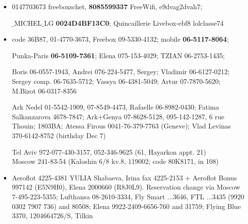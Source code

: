 \documentclass[12pt]{article}
\begin{document}
\begin{itemize}
\item  0147703673 freeboxschet,
{\bf 8085599337} FreeWifi,  e9dvag2dvah7; 

$\_$MICHEL$\_$LG {\bf 0024D4BF13C0}; Quincaillerie Livebox-ebf8 
lolclasse74

  

 



\item

code 36B87, 
 01-4770-3673,  Freebox
09-5330-4132; mobile {\bf 
06-5117-8064};

Punka-Paris {\bf 06-5109-7361}; Elena 
075-153-4029; 
TZIAN 
06-2753-1435; 

Boris 06-0557-1943, Andrei 076-224-5477, Sergey; 
Vladimir 06-6127-0212; Sergey comp. 06-7635-5712; Vassya 
06-4381-5049; Artur 07-7870-5620; 
M.Bizot
06-0317-8356


Ark Nedel 01-5542-1909, 07-8549-4473, Rafaelle 06-8982-0430; 
Fatima Salkanzarova 4678-7847;
 Ark+Genya 07-8628-5128, 095-142-1287, 6 rue Thouin; 
 1803BA; Atessa Firous 0041-76-379-7763 (Geneve); 
 Vlad Levinas 370-6142-8752 (birthday Dec 7)
 
Tel Aviv 972-077-430-3157, {052-346-9625}  (61, Hayarkon appt. 21)\\
Moscow
241-83-54 (Kaloshin 6/8 kv.8, 119002; code 80K8171, in 108)




\item 
Aeroflot 4225-4381 YULIA Shabaeva, Irina fax 4225-2153 + Aeroflot 
Bonus 
997142 (E5N9H0), Elena 2000660 (R8J0L9). Reservation change via Moscow 
7-495-223-5355;
Lufthansa 08-2610-3334, Fly Smart ...3646, FTL ...3435 
 (9920 0302 7907 736) 
 and 80508; Elena 9922-2409-6656-760 and 31759; Flying Blue 3370, 
1204664726/S, Tilkin 
\newpage


\end{itemize}
\end{document}
